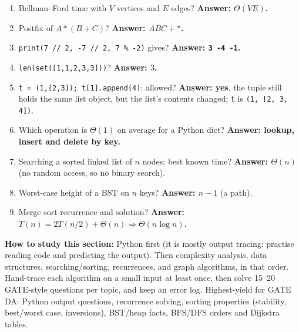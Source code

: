 \documentclass[11pt,a4paper]{article}
\newcommand{\py}[1]{\texttt{#1}}
\begin{document}
\begin{enumerate}[leftmargin=*,itemsep=3pt]
\item Bellman--Ford time with $V$ vertices and $E$ edges? \textbf{Answer: $\Theta(VE)$.}
\item Postfix of $A*(B+C)$? \textbf{Answer: $ABC+*$.}
\item \py{print(7 // 2, -7 // 2, 7 \% -2)} gives? \textbf{Answer: \py{3 -4 -1}.}
\item \py{len(set([1,1,2,3,3]))}? \textbf{Answer: $3$.}
\item \py{t = (1,[2,3]); t[1].append(4)}: allowed? \textbf{Answer: yes}, the tuple still holds the same list object, but the list's contents changed; \py{t} is \py{(1, [2, 3, 4])}.
\item Which operation is $\Theta(1)$ on average for a Python dict? \textbf{Answer: lookup, insert and delete by key.}
\item Searching a sorted linked list of $n$ nodes: best known time? \textbf{Answer: $\Theta(n)$} (no random access, so no binary search).
\item Worst-case height of a BST on $n$ keys? \textbf{Answer: $n-1$} (a path).
\item Merge sort recurrence and solution? \textbf{Answer: $T(n)=2T(n/2)+\Theta(n)\Rightarrow\Theta(n\log n)$.}
\end{enumerate}

\textbf{How to study this section:} Python first (it is mostly output tracing: practise reading code and predicting the output). Then complexity analysis, data structures, searching/sorting, recurrences, and graph algorithms, in that order. Hand-trace each algorithm on a small input at least once, then solve 15--20 GATE-style questions per topic, and keep an error log. Highest-yield for GATE DA: Python output questions, recurrence solving, sorting properties (stability, best/worst case, inversions), BST/heap facts, BFS/DFS orders and Dijkstra tables.
\end{document}
